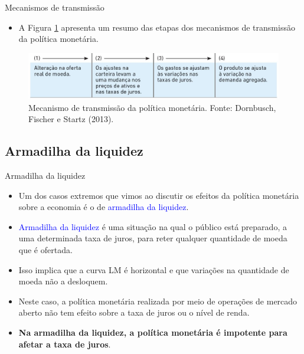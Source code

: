 \documentclass[10pt]{beamer}
\begin{document}
\begin{frame}{Mecanismos de transmissão}
\begin{itemize}
    \item A Figura \ref{fig2} apresenta um resumo das etapas dos mecanismos de transmissão da política monetária.
\end{itemize}
\bigskip
\begin{figure}
    \centering
    \includegraphics[width=\textwidth]{./figures/aula102_fig2.JPG}
    \caption{Mecanismo de transmissão da política monetária. Fonte: Dornbusch, Fischer e Startz (2013).}
    \label{fig2}
\end{figure}
\end{frame}

\subsection{Armadilha da liquidez}
\begin{frame}{Armadilha da liquidez}
    \begin{itemize}
        \item Um dos casos extremos que vimos ao discutir os efeitos da política monetária sobre a economia é o de \textcolor{blue}{armadilha da liquidez}.
        \bigskip
        \item \textcolor{blue}{Armadilha da liquidez} é uma situação na qual o público está preparado, a uma determinada taxa de juros, para reter qualquer quantidade de moeda que é ofertada.
        \bigskip
        \item Isso implica que a curva LM é horizontal e que variações na quantidade de moeda não a desloquem.
        \bigskip
        \item Neste caso, a política monetária realizada por meio de operações de mercado aberto não tem efeito sobre a taxa de juros ou o nível de renda.
        \bigskip
        \item \textbf{Na armadilha da liquidez, a política monetária é impotente para afetar a taxa de juros}.
    \end{itemize}
\end{frame}
\end{document}
